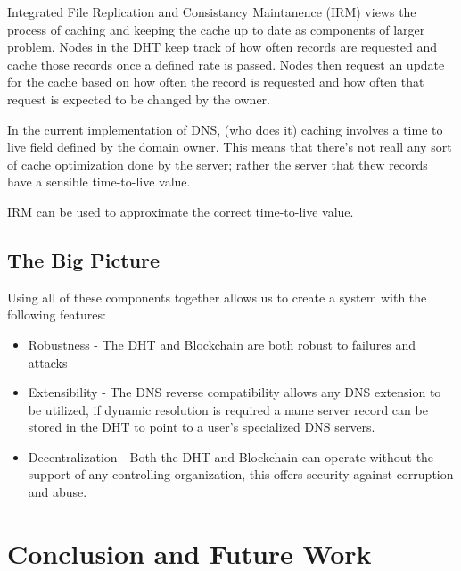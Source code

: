 \documentclass[11pt]{IEEEtran} %
\begin{document}
Integrated File Replication and Consistancy Maintanence (IRM) \cite{irm} views the process of caching and keeping the cache up to date as components of larger problem.  Nodes in the DHT keep track of how often records are requested and cache those records once a defined rate is passed.  Nodes then request an update for the cache based on how often the record is requested and how often that request is expected to be changed by the owner.


In the current implementation of DNS, (who does it) caching involves a time to live field defined by the domain owner. This means that there's not reall any sort of cache optimization done by the server; rather the server that thew records have a sensible time-to-live value.



IRM \cite{irm}  can be used to approximate the correct time-to-live value.


\subsection{The Big Picture}
Using all of these components together allows us to create a system with the following features:
\begin{itemize}
	\item Robustness - The DHT and Blockchain are both robust to failures and attacks
	\item Extensibility - The DNS reverse compatibility allows any DNS extension to be utilized, if dynamic resolution is required a name server record can be stored in the DHT to point to a user's specialized DNS servers.
	\item Decentralization - Both the DHT and Blockchain can operate without the support of any controlling organization, this offers security against corruption and abuse.
\end{itemize}	


\section{Conclusion and Future Work}


\end{document}
